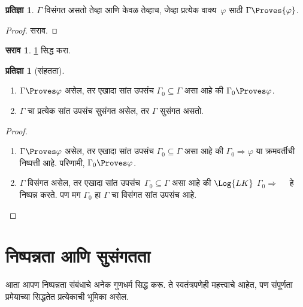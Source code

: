 \documentclass[11pt,a4paper,openany]{book}
\theoremstyle{definition}
\newtheorem{prop}[defn]{प्रतिज्ञा}
\newtheorem{prob}{सराव}[chapter]
\newcommand{\Sequent}{\Rightarrow}
\begin{document}
\begin{prop}
\label{fol:seq:ptn:prop:incons}
$\Gamma$ विसंगत असतो तेव्हा आणि केवळ तेव्हाच, जेव्हा प्रत्येक
  वाक्य~$\varphi$ साठी $\Gamma \Proves {\varphi}$.
\end{prop}

\begin{proof}
सराव.
\end{proof}

\begin{prob}
\ref{fol:seq:ptn:prop:incons} सिद्ध करा.
\end{prob}

\begin{prop}[संहतता]
  \label{fol:seq:ptn:prop:proves-compact}
  \begin{enumerate}
  \item $\Gamma \Proves \varphi$ असेल, तर एखादा सांत उपसंच $\Gamma_0
    \subseteq \Gamma$ असा आहे की $\Gamma_0 \Proves \varphi$.
  \item $\Gamma$ चा प्रत्येक सांत उपसंच सुसंगत असेल, तर $\Gamma$ सुसंगत
    असतो.
  \end{enumerate}
\end{prop}

\begin{proof}
  \begin{enumerate}
    \item $\Gamma \Proves \varphi$ असेल, तर एखादा सांत उपसंच
      $\Gamma_0 \subseteq \Gamma$ असा आहे की $\Gamma_0
      \Sequent \varphi$ या क्रमवर्तीची निष्पत्ती आहे. परिणामी,
      $\Gamma_0 \Proves \varphi$.
    \item $\Gamma$ विसंगत असेल, तर एखादा सांत
      उपसंच~$\Gamma_0 \subseteq \Gamma$ असा आहे की $\Log{LK}$
      $\Gamma_0 \Sequent \quad$ हे निष्पन्न करते. पण मग $\Gamma_0$ हा
      $\Gamma$ चा विसंगत सांत उपसंच आहे.
  \end{enumerate}
\end{proof}









\section{निष्पन्नता आणि सुसंगतता}\label{fol:seq:prv:sec}

आता आपण निष्पन्नता संबंधाचे अनेक गुणधर्म सिद्ध करू. ते स्वतंत्रपणेही
महत्त्वाचे आहेत, पण संपूर्णता प्रमेयाच्या सिद्धतेत प्रत्येकाची भूमिका असेल.
\end{document}
